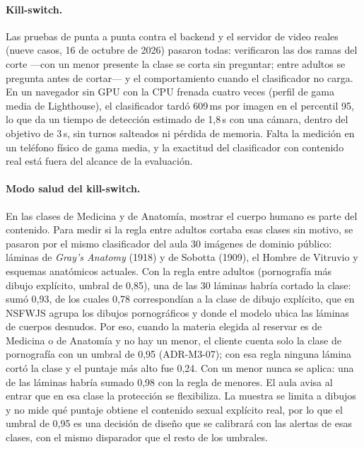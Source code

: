 \paragraph{Kill-switch.} Las pruebas de punta a punta contra el backend
y el servidor de video reales (nueve casos, 16 de octubre de 2026)
pasaron todas: verificaron las dos ramas del corte ---con un menor
presente la clase se corta sin preguntar; entre adultos se pregunta
antes de cortar--- y el comportamiento cuando el clasificador no carga.
En un navegador sin GPU con la CPU frenada cuatro veces (perfil de gama
media de Lighthouse), el clasificador tardó 609\,ms por imagen en el
percentil 95, lo que da un tiempo de detección estimado de 1,8\,s con
una cámara, dentro del objetivo de 3\,s, sin turnos salteados ni pérdida
de memoria. Falta la medición en un teléfono físico de gama media, y la
exactitud del clasificador con contenido real está fuera del alcance de
la evaluación.

\paragraph{Modo salud del kill-switch.} En las clases de Medicina y de
Anatomía, mostrar el cuerpo humano es parte del contenido. Para medir
si la regla entre adultos cortaba esas clases sin motivo, se pasaron por
el mismo clasificador del aula 30 imágenes de dominio público: láminas
de \emph{Gray's Anatomy} (1918) y de Sobotta (1909), el Hombre de
Vitruvio y esquemas anatómicos actuales. Con la regla entre adultos
(pornografía más dibujo explícito, umbral de 0,85), una de las 30
láminas habría cortado la clase: sumó 0,93, de los cuales 0,78
correspondían a la clase de dibujo explícito, que en NSFWJS agrupa los
dibujos pornográficos y donde el modelo ubica las láminas de cuerpos
desnudos. Por eso, cuando la materia elegida al reservar es de
Medicina o de Anatomía y no hay un menor, el cliente cuenta solo la
clase de pornografía con un umbral de 0,95 (ADR-M3-07); con esa regla
ninguna lámina cortó la clase y el puntaje más alto fue 0,24. Con un
menor nunca se aplica: una de las láminas habría sumado 0,98 con la
regla de menores. El aula avisa al entrar que en esa clase la
protección se flexibiliza. La muestra se limita a dibujos y no mide
qué puntaje obtiene el contenido sexual explícito real, por lo que el
umbral de 0,95 es una decisión de diseño que se calibrará con las
alertas de esas clases, con el mismo disparador que el resto de los
umbrales.

